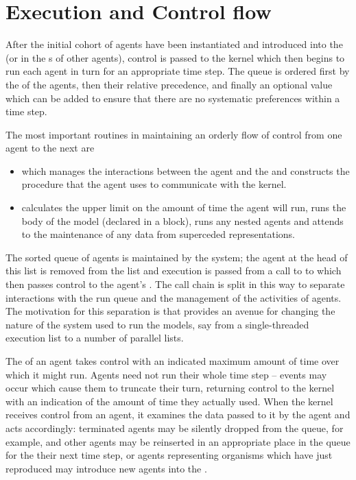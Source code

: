 \section{Execution and Control flow}

After the initial cohort of agents have been instantiated and
introduced into the  (or in the
s of other agents), control is passed to
the kernel which then begins to run each agent in turn for an
appropriate time step. The queue is ordered first by the
 of the agents, then their relative precedence, and
finally an optional  value which can be added to ensure that
there are no systematic preferences within a time step.

The most important routines in maintaining an orderly flow of control
from one agent to the next are
\begin{itemize}
\item[\method{run-agent}] which manages the interactions between the
  agent and the  and constructs the procedure that the agent uses
  to communicate with the kernel.

\item[\method{run}] calculates the upper limit on the amount of time the
  agent will run, runs the body of the model (declared in a
   block), runs any nested agents and attends to 
  the maintenance of any data from superceded representations.
\end{itemize}

The sorted queue of agents is maintained by the system; the agent at
the head of this list is removed from the list and execution is passed
from a call to  to   which then passes
control to the agent's . The call chain is split in
this way to separate interactions with the run queue and the
management of the activities of agents.  The motivation for this
separation is that provides an avenue for changing the nature of the
system used to run the models, say from a single-threaded execution
list to a number of parallel lists.

The  of an agent takes control with an indicated
maximum amount of time over which it might run.  Agents need not run
their whole time step -- events may occur which cause them to truncate
their turn, returning control to the kernel with an indication of the
amount of time they actually used.  When the kernel receives control
from an agent, it examines the data passed to it by the agent and acts
accordingly: terminated agents may be silently dropped from the queue,
for example, and other agents may be reinserted in an appropriate
place in the queue for the their next time step, or agents
representing organisms which have just reproduced may introduce new
agents into the .

